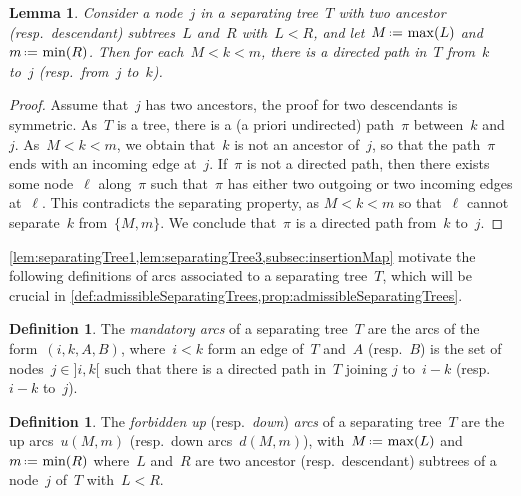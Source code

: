 \documentclass{amsart}
\newtheorem{lemma}[theorem]{Lemma}
\theoremstyle{definition}
\newtheorem{definition}[theorem]{Definition}
\newcommand{\eqdef}{\mbox{\,\raisebox{0.2ex}{\scriptsize\ensuremath{\mathrm:}}\ensuremath{=}\,}} %
\newcommand{\darkblue}{\color{darkblue}} %
\newcommand{\defn}[1]{\textsl{\darkblue #1}} %
\begin{document}
\begin{lemma}
\label{lem:separatingTree3}
Consider a node~$j$ in a separating tree~$T$ with two ancestor (resp.~descendant) subtrees~$L$ and~$R$ with~$L < R$, and let~$M \eqdef \max(L)$ and~$m \eqdef \min(R)$. Then for each~${M < k < m}$, there is a directed path in~$T$ from~$k$ to~$j$ (resp.~from~$j$ to~$k$).
\end{lemma}

\begin{proof}
Assume that~$j$ has two ancestors, the proof for two descendants is symmetric.
As~$T$ is a tree, there is a (a priori undirected) path~$\pi$ between~$k$ and~$j$.
As~$M < k < m$, we obtain that~$k$ is not an ancestor of~$j$, so that the path~$\pi$ ends with an incoming edge at~$j$.
If~$\pi$ is not a directed path, then there exists some node~$\ell$ along~$\pi$ such that~$\pi$ has either two outgoing or two incoming edges at~$\ell$.
This contradicts the separating property, as $M < k < m$ so that~$\ell$ cannot separate~$k$ from~$\{M,m\}$.
We conclude that~$\pi$ is a directed path from~$k$ to~$j$.
\end{proof}

\cref{lem:separatingTree1,lem:separatingTree3,subsec:insertionMap} motivate the following definitions of arcs associated to a separating tree~$T$, which will be crucial in \cref{def:admissibleSeparatingTrees,prop:admissibleSeparatingTrees}.

\begin{definition}
\label{def:mandatoryArcsSeparatingTree}
The \defn{mandatory arcs} of a separating tree~$T$ are the arcs of the form~$(i, k, A, B)$, where~$i < k$ form an edge of~$T$ and~$A$ (resp.~$B$) is the set of nodes~$j \in {]i,k[}$ such that there is a directed path in~$T$ joining $j$ to~$i-k$ (resp.~$i-k$ to~$j$).
\end{definition}

\begin{definition}
\label{def:forbiddenArcsSeparatingTree}
The \defn{forbidden up} (resp.~\defn{down}) \defn{arcs} of a separating tree~$T$ are the up arcs~$u(M, m)$ (resp.~down arcs~$d(M, m)$), with~$M \eqdef \max(L)$ and~$m \eqdef \min(R)$ where~$L$ and~$R$ are two ancestor (resp.~descendant) subtrees of a node~$j$ of~$T$ with~$L < R$.
\end{definition}
\end{document}
